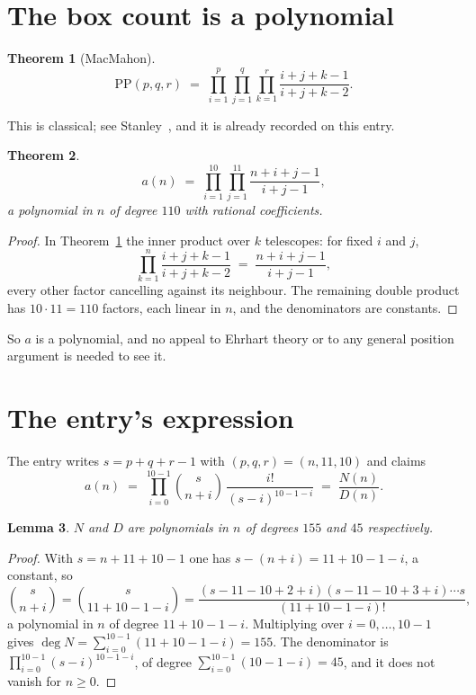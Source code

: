 \documentclass[11pt,a4paper]{article}
\theoremstyle{plain}
\newtheorem{theorem}{Theorem}
\newtheorem{lemma}[theorem]{Lemma}
\theoremstyle{definition}
\begin{document}
\section{The box count is a polynomial}

\begin{theorem}[MacMahon]\label{thm:mm}
\[
\mathrm{PP}(p,q,r)\;=\;\prod_{i=1}^{p}\prod_{j=1}^{q}\prod_{k=1}^{r}
\frac{i+j+k-1}{i+j+k-2} .
\]
\end{theorem}

This is classical; see Stanley~\cite{stanley}, and it is already recorded on this entry.

\begin{theorem}\label{thm:poly}
\[
a(n)\;=\;\prod_{i=1}^{10}\prod_{j=1}^{11}\frac{n+i+j-1}{i+j-1},
\]
a polynomial in $n$ of degree $110$ with rational coefficients.
\end{theorem}

\begin{proof}
In Theorem~\ref{thm:mm} the inner product over $k$ telescopes: for fixed $i$ and $j$,
\[
\prod_{k=1}^{n}\frac{i+j+k-1}{i+j+k-2}\;=\;\frac{n+i+j-1}{i+j-1} ,
\]
every other factor cancelling against its neighbour. The remaining double product has
$10\cdot11=110$ factors, each linear in $n$, and the denominators are constants.
\end{proof}

So $a$ is a polynomial, and no appeal to Ehrhart theory or to any general position argument is
needed to see it.

\section{The entry's expression}

The entry writes $s=p+q+r-1$ with $(p,q,r)=(n,11,10)$ and claims
\[
a(n)\;=\;\prod_{i=0}^{10-1}\binom{s}{n+i}\,\frac{i!}{(s-i)^{10-1-i}}\;=\;
\frac{N(n)}{D(n)} .
\]

\begin{lemma}\label{lem:deg}
$N$ and $D$ are polynomials in $n$ of degrees $155$ and $45$ respectively.
\end{lemma}

\begin{proof}
With $s=n+11+10-1$ one has $s-(n+i)=11+10-1-i$, a constant, so
\[
\binom{s}{n+i}=\binom{s}{11+10-1-i}
=\frac{(s-11-10+2+i)(s-11-10+3+i)\cdots s}{(11+10-1-i)!},
\]
a polynomial in $n$ of degree $11+10-1-i$. Multiplying over $i=0,\dots,10-1$ gives
$\deg N=\sum_{i=0}^{10-1}(11+10-1-i)=155$. The denominator is
$\prod_{i=0}^{10-1}(s-i)^{10-1-i}$, of degree
$\sum_{i=0}^{10-1}(10-1-i)=45$, and it does not vanish for $n\ge0$.
\end{proof}
\end{document}
